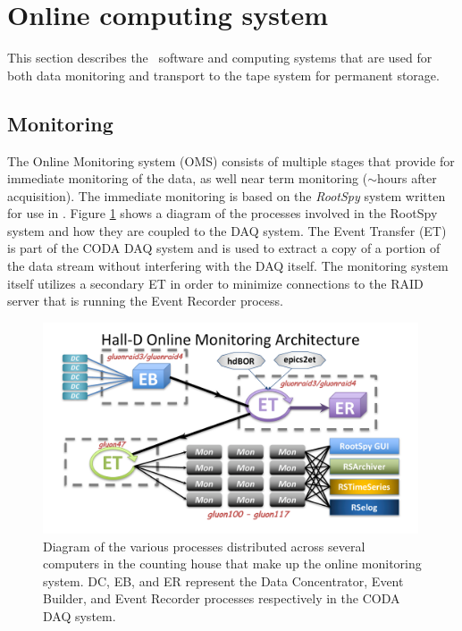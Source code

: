 
\section[Online computing system]{Online computing system \label{sec:online}}

This section describes the \GX ~software and computing systems that are used for both data monitoring and transport to the tape system for permanent storage.

\subsection{Monitoring \label{sec:onlinemonitoring}}

The Online Monitoring system (OMS) consists of multiple stages that provide for immediate monitoring of the data, as well near term monitoring ($\sim$hours after acquisition). The immediate monitoring is based on the \textit{RootSpy} system\cite{rootspy} written for use in \GX. Figure \ref{fig:online_monitoring_processes} shows a diagram of the processes involved in the RootSpy system and how they are coupled to the DAQ system. The Event Transfer (ET) is part of the CODA DAQ system\cite{coda} and is used to extract a copy of a portion of the data stream without interfering with the DAQ itself. The monitoring system itself utilizes a secondary ET in order to minimize connections to the RAID server that is running the Event Recorder process.

\begin{figure}[tbp]
\begin{center}
\includegraphics[width=0.99\textwidth, clip,trim=1.5cm 0.9cm 1.7cm 0.8cm]{figures/online_monitoring_processes.pdf}
\caption{\label{fig:online_monitoring_processes}Diagram of the various processes distributed across several computers in the counting house that make up the online monitoring system. DC, EB, and ER represent the Data Concentrator, Event Builder, and Event Recorder processes respectively in the CODA DAQ system.}   
\end{center}  
\end{figure}

